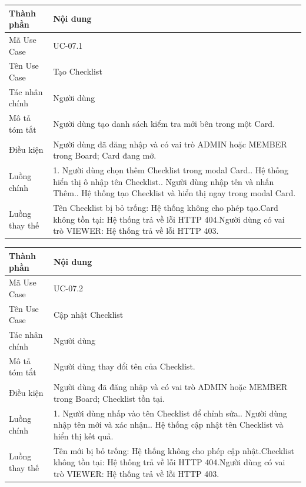 \vspace{0.3cm}
\noindent\begin{tabular}{|p{3.5cm}|p{10.5cm}|}
\hline
\textbf{Thành phần} & \textbf{Nội dung} \\
\hline
Mã Use Case & UC-07.1 \\
\hline
Tên Use Case & Tạo Checklist \\
\hline
Tác nhân chính & Người dùng \\
\hline
Mô tả tóm tắt & Người dùng tạo danh sách kiểm tra mới bên trong một Card. \\
\hline
Điều kiện & Người dùng đã đăng nhập và có vai trò ADMIN hoặc MEMBER trong Board; Card đang mở. \\
\hline
Luồng chính & 1. Người dùng chọn thêm Checklist trong modal Card.\newline 2. Hệ thống hiển thị ô nhập tên Checklist.\newline 3. Người dùng nhập tên và nhấn Thêm.\newline 4. Hệ thống tạo Checklist và hiển thị ngay trong modal Card. \\
\hline
Luồng thay thế & Tên Checklist bị bỏ trống: Hệ thống không cho phép tạo.\newline Card không tồn tại: Hệ thống trả về lỗi HTTP 404.\newline Người dùng có vai trò VIEWER: Hệ thống trả về lỗi HTTP 403. \\
\hline
\end{tabular}

\vspace{0.5cm}
\noindent\begin{tabular}{|p{3.5cm}|p{10.5cm}|}
\hline
\textbf{Thành phần} & \textbf{Nội dung} \\
\hline
Mã Use Case & UC-07.2 \\
\hline
Tên Use Case & Cập nhật Checklist \\
\hline
Tác nhân chính & Người dùng \\
\hline
Mô tả tóm tắt & Người dùng thay đổi tên của Checklist. \\
\hline
Điều kiện & Người dùng đã đăng nhập và có vai trò ADMIN hoặc MEMBER trong Board; Checklist tồn tại. \\
\hline
Luồng chính & 1. Người dùng nhấp vào tên Checklist để chỉnh sửa.\newline 2. Người dùng nhập tên mới và xác nhận.\newline 3. Hệ thống cập nhật tên Checklist và hiển thị kết quả. \\
\hline
Luồng thay thế & Tên mới bị bỏ trống: Hệ thống không cho phép cập nhật.\newline Checklist không tồn tại: Hệ thống trả về lỗi HTTP 404.\newline Người dùng có vai trò VIEWER: Hệ thống trả về lỗi HTTP 403. \\
\hline
\end{tabular}

